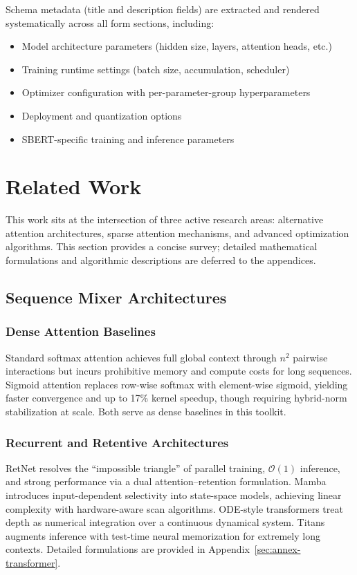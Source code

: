 \documentclass[11pt,a4paper]{article}
\begin{document}
Schema metadata (title and description fields) are extracted and rendered systematically across all form sections, including:
\begin{itemize}[leftmargin=*]
    \item Model architecture parameters (hidden size, layers, attention heads, etc.)
    \item Training runtime settings (batch size, accumulation, scheduler)
    \item Optimizer configuration with per-parameter-group hyperparameters
    \item Deployment and quantization options
    \item SBERT-specific training and inference parameters
\end{itemize}

\section{Related Work}

This work sits at the intersection of three active research areas: alternative attention architectures, sparse attention mechanisms, and advanced optimization algorithms. This section provides a concise survey; detailed mathematical formulations and algorithmic descriptions are deferred to the appendices.

\subsection{Sequence Mixer Architectures}

\subsubsection{Dense Attention Baselines}
Standard softmax attention \citep{vaswani_attention_2017} achieves full global context through $n^2$ pairwise interactions but incurs prohibitive memory and compute costs for long sequences. Sigmoid attention \citep{ramapuram_theory_2024} replaces row-wise softmax with element-wise sigmoid, yielding faster convergence and up to 17\% kernel speedup, though requiring hybrid-norm stabilization at scale. Both serve as dense baselines in this toolkit.

\subsubsection{Recurrent and Retentive Architectures}
RetNet \citep{sun_retentive_2023} resolves the ``impossible triangle'' of parallel training, $\mathcal{O}(1)$ inference, and strong performance via a dual attention--retention formulation. Mamba \citep{gu_mamba_2023} introduces input-dependent selectivity into state-space models, achieving linear complexity with hardware-aware scan algorithms. ODE-style transformers \citep{zhang_continuous_2021} treat depth as numerical integration over a continuous dynamical system. Titans \citep{behrouz_titans_2025} augments inference with test-time neural memorization for extremely long contexts. Detailed formulations are provided in Appendix~\ref{sec:annex-transformer}.
\end{document}
